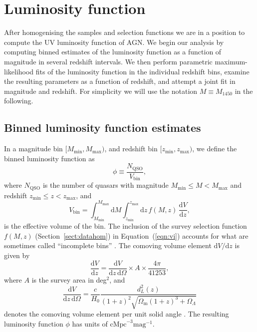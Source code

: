 \documentclass[fleqn,usenatbib]{mnras}
\begin{document}
\section{Luminosity function}
\label{sec:lf}


After homogenising the samples and selection functions we are in a position
to compute the UV luminosity function of AGN. We begin our analysis by computing
binned estimates of the luminosity function as a function of magnitude in several redshift intervals.
We then perform parametric maximum-likelihood fits of the luminosity function in the individual redshift bins,
examine the resulting parameters as a function of redshift, and attempt a joint fit in magnitude and redshift.
For simplicity we will use the notation $M\equiv M_{1450}$ in the following.

\subsection{Binned luminosity function estimates}
\label{sec:binnedlf}

In a magnitude bin $[M_\mathrm{min}, M_\mathrm{max})$, and redshift
  bin $[z_\mathrm{min}, z_\mathrm{max})$, we define the binned luminosity
function as \citep{2000MNRAS.311..433P}
\begin{equation}
  \phi \equiv \frac{N_\mathrm{QSO}}{V_\mathrm{bin}},
\end{equation}
where $N_\mathrm{QSO}$ is the number of quasars with magnitude
$M_\mathrm{min}\leq M<M_\mathrm{max}$ and redshift
$z_\mathrm{min}\leq z<z_\mathrm{max}$, and
\begin{equation}
  V_\mathrm{bin} = \int_{M_\mathrm{min}}^{M_\mathrm{max}}\mathrm{d}M
  \int_{z_\mathrm{min}}^{z_\mathrm{max}}\mathrm{d}z\, f(M, z)\,\frac{\mathrm{d}V}{\mathrm{d}z},
  \label{eqn:vi}
\end{equation}
is the effective volume of the bin. The inclusion of the survey selection function
$f(M,z)$ (Section~\ref{sect:datahom}) in Equation~(\ref{eqn:vi}) accounts for
what are sometimes called ``incomplete bins''
\citep{2006AJ....131.2766R}.  The comoving volume element $\mathrm{d}V/\mathrm{d}z$ is
given by
\begin{equation}
  \frac{\mathrm{d}V}{\mathrm{d}z}=\frac{\mathrm{d}V}{\mathrm{d}z\,\mathrm{d}\Omega}\times A\times\frac{4\pi}{41253},
\end{equation}
where $A$ is the survey area in deg$^2$, and 
\begin{equation}
  \frac{\mathrm{d}V}{\mathrm{d}z\,\mathrm{d}\Omega}=\frac{c}{H_0}\frac{d_L^2\left(z\right)}
       {\left(1+z\right)^2\sqrt{\Omega_\mathrm{m}\left(1+z\right)^3+\Omega_\Lambda}}
  \label{eqn:dvdzdo}
\end{equation}
denotes the comoving volume element per unit solid angle
\citep{1999astro.ph..5116H}. The resulting luminosity function $\phi$ has units of
$\mathrm{cMpc}^{-3}\mathrm{mag}^{-1}$. 
\end{document}
